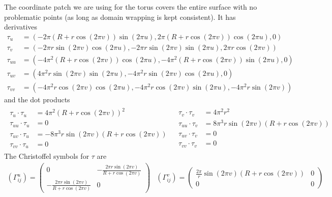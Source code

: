 \documentclass{article}
\begin{document}
		The coordinate patch we are using for the torus covers the entire surface with no problematic points (as long as domain wrapping is kept consistent). It has derivatives
		\begin{equation*} \begin{split}
			\tau_u & = ( -2\pi(R+r\cos(2\pi v))\sin(2\pi u) , 2\pi(R+r\cos(2\pi v))\cos(2\pi u) , 0 ) \\
			\tau_v & = ( -2\pi r\sin(2\pi v)\cos(2\pi u) , -2\pi r\sin(2\pi v)\sin(2\pi u) , 2\pi r\cos(2\pi v) ) \\
			\tau_{uu} & = ( -4\pi^2(R+r\cos(2\pi v))\cos(2\pi u) , -4\pi^2(R+r\cos(2\pi v))\sin(2\pi u) , 0 ) \\
			\tau_{uv} & = ( 4\pi^2r\sin(2\pi v)\sin(2\pi u) , -4\pi^2r\sin(2\pi v)\cos(2\pi u) , 0 ) \\
			\tau_{vv} & = ( -4\pi^2 r\cos(2\pi v)\cos(2\pi u) , -4\pi^2r\cos(2\pi v)\sin(2\pi u) , -4\pi^2r\sin(2\pi v) )
		\end{split} \end{equation*}
		and the dot products
		\begin{equation*} \begin{array}{ll}
			\begin{split}
				\tau_u \cdot \tau_u & = 4\pi^2(R+r\cos(2\pi v))^2 \\
				\tau_{uu} \cdot \tau_u & = 0 \\
				\tau_{uv} \cdot \tau_u & = -8\pi^3r\sin(2\pi v)(R+r\cos(2\pi v)) \\
				\tau_{vv} \cdot \tau_u & = 0
			\end{split} & \begin{split}
				\tau_v \cdot \tau_v & = 4\pi^2r^2 \\
				\tau_{uu} \cdot \tau_v & = 8\pi^3r\sin(2\pi v)(R+r\cos(2\pi v)) \\
				\tau_{uv} \cdot \tau_v & = 0 \\
				\tau_{vv} \cdot \tau_v & = 0
			\end{split}
		\end{array} \end{equation*}
		The Christoffel symbols for $\tau$ are
		\begin{equation}
			\begin{array}{lr}
				\left(\Gamma^{u}_{ij}\right) = \left( \begin{array}{cc}
					0 & -\frac{2\pi r\sin(2\pi v)}{R+r\cos(2\pi v)} \\
					-\frac{2\pi r\sin(2\pi v)}{R+r\cos(2\pi v)} & 0
				\end{array} \right) &
				\left(\Gamma^{v}_{ij}\right) = \left( \begin{array}{cc}
					\frac{2\pi}{r}\sin(2\pi v)(R+r\cos(2\pi v)) & 0 \\
					0 & 0
				\end{array} \right)
			\end{array}
		\end{equation}
	
\end{document}
